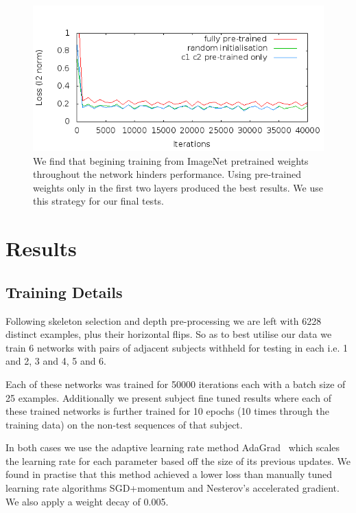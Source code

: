 \documentclass[11pt]{article} %
\begin{document}
\begin{figure}
\centering
\includegraphics*[width=0.9\linewidth,clip]{AlexNetInitComploss.png} 
\caption{We find that begining training from ImageNet pretrained weights throughout the network hinders performance. Using pre-trained weights only in the first two layers produced the best results. We use this strategy for our final tests. \label{fig:alexNetpre}}
\end{figure}





\section{Results}

\subsection{Training Details}


Following skeleton selection and depth pre-processing we are left with 6228 distinct examples, plus their horizontal flips. So as to best utilise our data we train 6 networks with pairs of adjacent subjects withheld for testing in each i.e. 1 and 2, 3 and 4, 5 and 6. 

Each of these networks was trained for 50000 iterations each with a batch size of 25 examples. Additionally we present subject fine tuned results where each of these trained networks is further trained for 10 epochs (10 times through the training data) on the non-test sequences of that subject. 

In both cases we use the adaptive learning rate method AdaGrad~\cite{Duchi2011} which scales the learning rate for each parameter based off the size of its previous updates. We found in practise that this method achieved a lower loss than manually tuned learning rate algorithms SGD+momentum and Nesterov's accelerated gradient. We also apply a weight decay of 0.005.  
\end{document}
